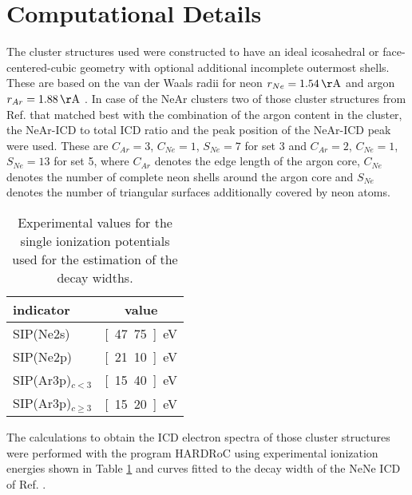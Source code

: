 \section{Computational Details}
\label{sec:computational}
The cluster structures used were constructed to have an ideal icosahedral or
face-centered-cubic geometry with optional additional incomplete outermost
shells. These are based on the van der Waals radii for neon
$r_{Ne}=\unit[1.54]{\AA}$
and argon $r_{Ar}=\unit[1.88]{\AA}$ \cite{Bondi64}.
In case of the NeAr clusters two of those
cluster structures from Ref. \cite{Fasshauer14_1} that matched best
with the combination of the argon content in the cluster,
the NeAr-ICD to total
ICD ratio and the peak position of the NeAr-ICD peak were used.
These are $C_{Ar}=3$, $C_{Ne}=1$, $S_{Ne}=7$
for set 3
and $C_{Ar}=2$, $C_{Ne}=1$, $S_{Ne}=13$ for set 5, where $C_{Ar}$ denotes
the edge length of the argon core, $C_{Ne}$ denotes the number of complete
neon shells around the argon core and $S_{Ne}$ denotes the number of 
triangular surfaces additionally covered by neon atoms.


\begin{table}[h]
 \caption{Experimental values for the single ionization potentials
          \cite{Fasshauer14_1}
          used for the estimation of the decay widths.}
 \label{table:exp_input}
 \centering
 \begin{tabular}{lc}
  \toprule
  indicator            &  value \\
  \midrule
  SIP(Ne2s)            &  \unit[47.75]{eV} \\
  SIP(Ne2p)            &  \unit[21.10]{eV} \\
  SIP(Ar3p)$_{c<3}$    &  \unit[15.40]{eV} \\
  SIP(Ar3p)$_{c\ge 3}$ &  \unit[15.20]{eV} \\
  \bottomrule
 \end{tabular}
\end{table}


The calculations to obtain the ICD electron spectra of those cluster
structures were performed with
the program HARDRoC \cite{HARDRoC} using experimental ionization energies shown
in Table \ref{table:exp_input} and curves fitted to the decay width of the
NeNe ICD of Ref. \cite{Averbukh06_1}.
